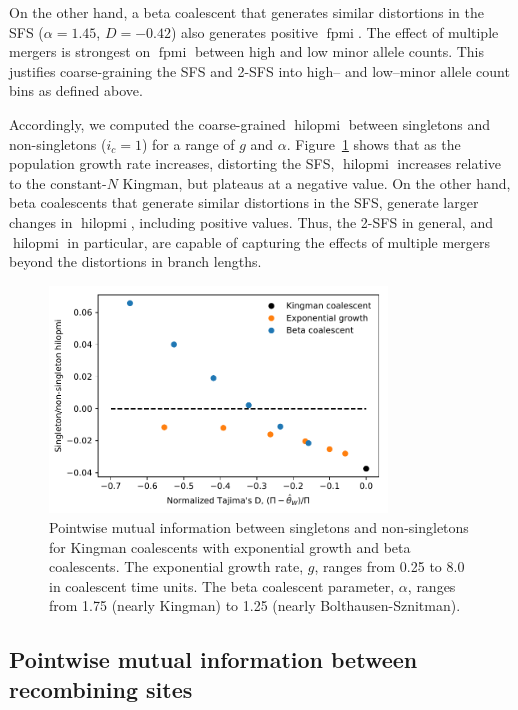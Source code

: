 \documentclass[11pt, letterpaper]{article}   	%
\newcommand{\Fig}[1]{Figure~\ref{#1}}
\DeclareMathOperator{\fpmi}{fpmi}
\DeclareMathOperator{\hilopmi}{hilopmi}
\begin{document}
On the other hand, a beta coalescent that generates similar distortions in the SFS ($\alpha=1.45$, $D = -0.42$) also generates positive $\fpmi$.
The effect of multiple mergers is strongest on $\fpmi$ between high and low minor allele counts.
This justifies coarse-graining the SFS and 2-SFS into high-- and low--minor allele count bins as defined above.

Accordingly, we computed the coarse-grained $\hilopmi$ between singletons and non-singletons ($i_c = 1$) for a range of $g$ and $\alpha$.
\Fig{fig:fpmi_vs_tajimasd} shows that as the population growth rate increases, distorting the SFS, $\hilopmi$ increases relative to the constant-$N$ Kingman, but plateaus at a negative value.
On the other hand, beta coalescents that generate similar distortions in the SFS, generate larger changes in $\hilopmi$, including positive values.
Thus, the 2-SFS in general, and $\hilopmi$ in particular, are capable of capturing the effects of multiple mergers beyond the distortions in branch lengths.

\begin{figure}
\centering
\includegraphics[width=0.8\textwidth]{figures/figure2.pdf}
\caption{Pointwise mutual information between singletons and non-singletons for Kingman coalescents with exponential growth and beta coalescents. The exponential growth rate, $g$, ranges from 0.25 to 8.0 in coalescent time units. The beta coalescent parameter, $\alpha$, ranges from 1.75 (nearly Kingman) to 1.25 (nearly Bolthausen-Sznitman). \label{fig:fpmi_vs_tajimasd}}
\end{figure}

\subsection*{Pointwise mutual information between recombining sites}
\end{document}

